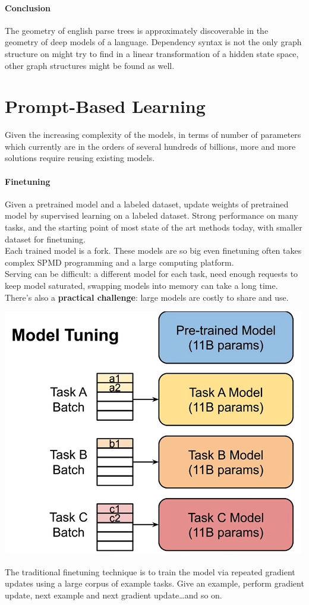 \documentclass[10pt]{report}
\begin{document}
\paragraph{Conclusion} The geometry of english parse trees is approximately discoverable in the geometry of deep models of a language. Dependency syntax is not the only graph structure on might try to find in a linear transformation of a hidden state space, other graph structures might be found as well.
\section{Prompt-Based Learning}
Given the increasing complexity of the models, in terms of number of parameters which currently are in the orders of several hundreds of billions, more and more solutions require reusing existing models.
\paragraph{Finetuning} Given a pretrained model and a labeled dataset, update weights of pretrained model by supervised learning on a labeled dataset. Strong performance on many tasks, and the starting point of most state of the art methods today, with smaller dataset for finetuning.\\
Each trained model is a fork. These models are so big even finetuning often takes complex SPMD programming and a large computing platform.\\
Serving can be difficult: a different model for each task, need enough requests to keep model saturated, swapping models into memory can take a long time. There's also a \textbf{practical challenge}: large models are costly to share and use.
\begin{center}
	\includegraphics[scale=0.5]{83.png}
\end{center}
The traditional finetuning technique is to train the model via repeated gradient updates using a large corpus of example tasks. Give an example, perform gradient update, next example and next gradient update\ldots and so on.
\end{document}
